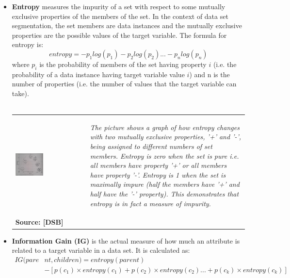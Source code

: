 \begin{itemize}
   \item \textbf{Entropy} measures the impurity of a set with respect to some mutually exclusive properties of the members of the set. In the context of data set segmentation, the set members are data instances and the mutually exclusive properties are the possible values of the target variable. The formula for entropy is:
    $$ entropy = - p_1log(p_1) - p_2log(p_2) ... - p_nlog(p_n)$$
    where $p_i$ is the probability of members of the set having property $i$ (i.e. the probability of a data instance having target variable value $i$) and n is the number of properties (i.e. the number of values that the target variable can take).\\\\
    \begin{tabular}{m{}m{}}
      \includegraphics[width=0.41\textwidth]{entropy.jpg} & \begin{spacing}{0.7}{\small \emph{The picture shows a graph of how entropy changes with two mutually exclusive properties, '+' and '-', being assigned to different numbers of set members. Entropy is zero when the set is pure i.e. all members have property '+' or all members have property '-'. Entropy is 1 when the set is maximally impure (half the members have '+' and half have the '-' property). This demonstrates that entropy is in fact a measure of impurity.}}\end{spacing} \\ [-1.5ex]
{\fontsize{10}{0}\selectfont \textbf{Source: [DSB]}} & \\
    \end{tabular}
    \twoex
  \item \textbf{Information Gain (IG)} is the actual measure of how much an attribute is related to a target variable in a data set. It is calculated as:
    {\setlength{\mathindent}{0cm}
    \begin{align*}
      IG(pare&nt, children) = entropy(parent) \\
      &-[p(c_1)\times entropy(c_1)+p(c_2)\times entropy(c_2) ... +p(c_k)\times entropy(c_k)]

\end{align*}}
\end{itemize}
